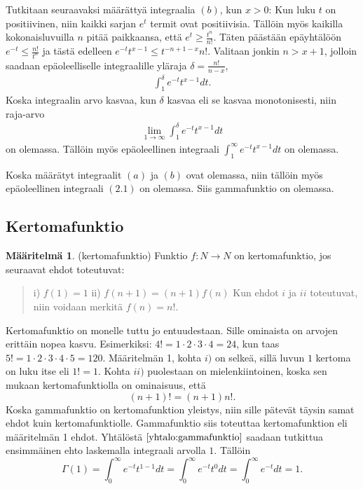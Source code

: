 \documentclass[12pt]{article}
\theoremstyle{definition}
\newtheorem{maar}{Määritelmä}
\theoremstyle{plain}
\numberwithin{equation}{section}
\begin{document}
Tutkitaan seuraavaksi määrättyä integraalia $(b)$, kun $x>0$: \newline
Kun luku $t$ on positiivinen, niin kaikki sarjan $e^t$ termit ovat positiivisia. Tällöin myös kaikilla kokonaisluvuilla $n$ pitää paikkaansa, että $e^t\ge\frac{t^n}{n!}$. Täten päästään epäyhtälöön $e^{-t}\le\frac{n!}{t^n}$ ja tästä edelleen $e^{-t}t^{x-1}\le{t^{-{n+1-x}}}{n!}$. Valitaan jonkin $n>x+1$, jolloin saadaan epäoleelliselle integraalille yläraja $\delta=\frac{n!}{n-x}$,
\begin{align*}
    \int_1^{\delta}e^{-t}t^{x-1}dt.
\end{align*}
Koska integraalin arvo kasvaa, kun $\delta$ kasvaa eli se kasvaa monotonisesti, niin raja-arvo 
\begin{align*}
    \lim_{1\to\infty}\int_1^{\delta}e^{-t}t^{x-1}dt
\end{align*}
on olemassa. Tällöin myös epäoleellinen integraali $\int_1^{\infty}e^{-t}t^{x-1}dt$ on olemassa.\newline

Koska määrätyt integraalit $(a)$ ja $(b)$ ovat olemassa, niin tällöin myös epäoleellinen integraali $(2.1)$ on olemassa. Siis gammafunktio on olemassa.



\subsection{Kertomafunktio}
\begin{maar}
(kertomafunktio)
Funktio $f: N \rightarrow N$ on kertomafunktio, jos seuraavat ehdot toteutuvat:
\begin{quote}
    i) $f(1)=1$ \newline
    ii) $f(n+1)=(n+1)f(n)$ \newline
    Kun ehdot $i$ ja $ii$ toteutuvat, niin voidaan merkitä $f(n)=n!$.
\end{quote}
\end{maar}
Kertomafunktio on monelle tuttu jo entuudestaan. Sille ominaista on arvojen erittäin nopea kasvu. Esimerkiksi: $4! = 1\cdot 2\cdot3\cdot4=24$, kun taas $5! = 1\cdot2\cdot3\cdot4\cdot5=120$.
Määritelmän 1, kohta $i)$ on selkeä, sillä luvun $1$ kertoma on luku itse eli $1!=1$. Kohta $ii)$ puolestaan on mielenkiintoinen, koska sen mukaan kertomafunktiolla on ominaisuus, että 
\begin{equation}
    (n+1)! = (n+1)n!.
\end{equation}
Koska gammafunktio on kertomafunktion yleistys, niin sille pätevät täysin samat ehdot kuin kertomafunktiolle. Gammafunktio siis toteuttaa kertomafunktion eli määritelmän 1 ehdot. Yhtälöstä $\eqref{yhtalo:gammafunktio}$ saadaan tutkittua ensimmäinen ehto laskemalla integraali arvolla $1$. Tällöin
\begin{equation*}
    \Gamma(1)=\int_0^\infty e^{-t}t^{1-1}dt=\int_0^\infty e^{-t}t^{0}dt = \int_0^\infty e^{-t}dt = 1.
\end{equation*}
\end{document}
